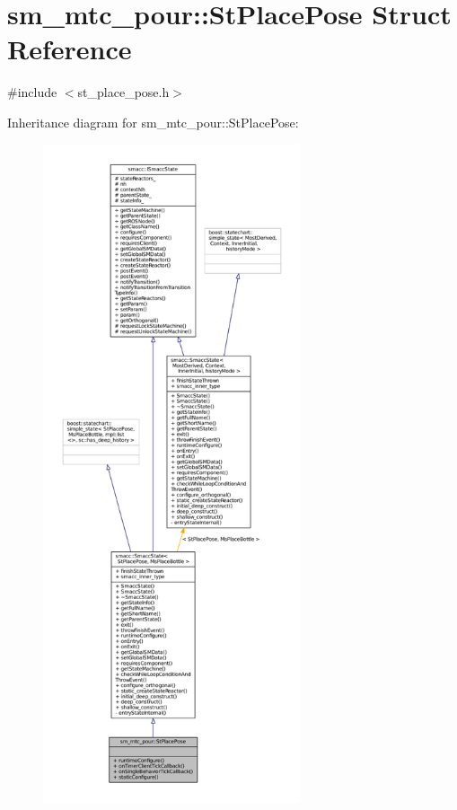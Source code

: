 \hypertarget{structsm__mtc__pour_1_1StPlacePose}{}\section{sm\+\_\+mtc\+\_\+pour\+:\+:St\+Place\+Pose Struct Reference}
\label{structsm__mtc__pour_1_1StPlacePose}


{\ttfamily \#include $<$st\+\_\+place\+\_\+pose.\+h$>$}



Inheritance diagram for sm\+\_\+mtc\+\_\+pour\+:\+:St\+Place\+Pose\+:
\nopagebreak
\begin{figure}[H]
\begin{center}
\leavevmode
\includegraphics[height=550pt]{structsm__mtc__pour_1_1StPlacePose__inherit__graph}
\end{center}
\end{figure}


